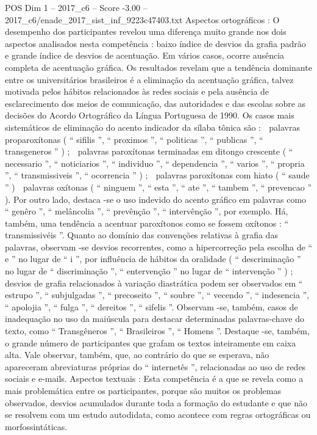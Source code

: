 \begin{textsample}{POS Dim 1 – 2017\_c6 – Score -3.00 – 2017\_c6/enade\_2017\_sist\_inf\_9223c47403.txt}
Aspectos ortográficos : O desempenho dos participantes revelou uma diferença muito grande nos dois aspectos analisados nesta competência : baixo índice de desvios da grafia padrão e grande índice de desvios de acentuação.
Em vários casos, ocorre ausência completa de acentuação gráfica.
Os resultados revelam que a tendência dominante entre os universitários brasileiros é a eliminação da acentuação gráfica, talvez motivada pelos hábitos relacionados às redes sociais e pela ausência de esclarecimento dos meios de comunicação, das autoridades e das escolas sobre as decisões do Acordo Ortográfico da Língua Portuguesa de 1990.
Os casos mais sistemáticos de eliminação do acento indicador da sílaba tônica são :  palavras proparoxítonas ( “ sifilis ”, “ proximos ”, “ politicas ”, “ publicas ”, “ transgeneros ” ) ;  palavras paroxítonas terminadas em ditongo crescente ( “ necessario ”, “ noticiarios ”, “ individuo ”, “ dependencia ”, “ varios ”, “ propria ”, “ transmissiveis ”, “ ocorrencia ” ) ;  palavras paroxítonas com hiato ( “ saude ” )  palavras oxítonas ( “ ninguem ”, “ esta ”, “ ate ”, “ tambem ”, “ prevencao ” ).
Por outro lado, destaca -se o uso indevido do acento gráfico em palavras como “ genêro ”, “ melâncolia ”, “ prevênção ”, “ intervênção ”, por exemplo.
Há, também, uma tendência a acentuar paroxítonos como se fossem oxítonos : “ transmissivéis ”.
Quanto ao domínio das convenções relativas à grafia das palavras, observam -se desvios recorrentes, como a hipercorreção pela escolha de “ e ” no lugar de “ i ”, por influência de hábitos da oralidade ( “ descriminação ” no lugar de “ discriminação ”, “ entervenção ” no lugar de “ intervenção ” ) ; desvios de grafia relacionados à variação diastrática podem ser observados em “ estrupo ”, “ subjulgadas ”, “ precoseito ”, “ soubre ”, “ vecendo ”, “ indesencia ”, “ apolojia ”, “ fulga ”, “ dereitos ”, “ sifelis ”.
Observam -se, também, casos de inadequação no uso da maiúscula para destacar determinadas palavras-chave do texto, como “ Transgêneros ”, “ Brasileiros ”, “ Homens ”.
Destaque -se, também, o grande número de participantes que grafam os textos inteiramente em caixa alta.
Vale observar, também, que, ao contrário do que se esperava, não apareceram abreviaturas próprias do “ internetês ”, relacionadas ao uso de redes sociais e e-mails.
Aspectos textuais : Esta competência é a que se revela como a mais problemática entre os participantes, porque são muitos os problemas observados, desvios acumulados durante toda a formação do estudante e que não se resolvem com um estudo autodidata, como acontece com regras ortográficas ou morfossintáticas.

\end{textsample}
